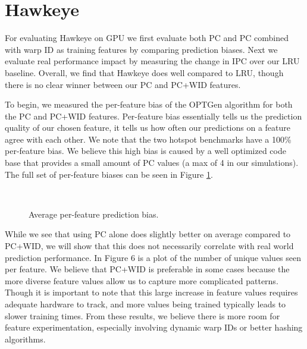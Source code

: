\section{Hawkeye}
For evaluating Hawkeye on GPU we first evaluate both PC and PC combined with warp ID as training features by comparing prediction biases. Next we evaluate real performance impact by measuring the change in IPC over our LRU baseline. Overall, we find that Hawkeye does well compared to LRU, though there is no clear winner between our PC and PC+WID features.

To begin, we measured the per-feature bias of the OPTGen algorithm for both the PC and PC+WID features. Per-feature bias essentially tells us the prediction quality of our chosen feature, it tells us how often our predictions on a feature agree with each other. We note that the two hotspot benchmarks have a 100\% per-feature bias. We believe this high bias is caused by a well optimized code base that provides a small amount of PC values (a max of 4 in our simulations). The full set of per-feature biases can be seen in Figure \ref{f:feature_bias}.

\begin{figure}[htb]
\begin{center}
\ 
\caption{Average per-feature prediction bias.}
\label{f:feature_bias}
\end{center}
\end{figure}

While we see that using PC alone does slightly better on average compared to PC+WID, we will show that this does not necessarily correlate with real world prediction performance. In Figure 6 is a plot of the number of unique values seen per feature. We believe that PC+WID is preferable in some cases because the more diverse feature values allow us to capture more complicated patterns. Though it is important to note that this large increase in feature values requires adequate hardware to track, and more values being trained typically leads to slower training times. From these results, we believe there is more room for feature experimentation, especially involving dynamic warp IDs or better hashing algorithms.


